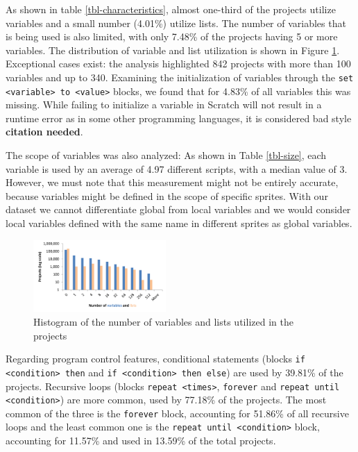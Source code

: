 \documentclass{sig-alternate}
\newcommand{\todo}[1]{\textbf{#1}}
\begin{document}
As shown in table \ref{tbl-characteristics}, almost one-third of the projects utilize variables and a small number (4.01\%) utilize lists. The number of variables that is being used is also limited, with only 7.48\% of the projects having 5 or more variables. The distribution of variable and list utilization is shown in Figure \ref{fig:variables}. Exceptional cases exist: the analysis highlighted 842 projects with more than 100 variables and up to 340. Examining the initialization of variables through the \texttt{set <variable> to <value>} blocks, we found that for 4.83\% of all variables this was missing. While failing to initialize a variable in Scratch will not result in a runtime error as in some other programming languages, it is considered bad style \todo{citation needed}.

The scope of variables was also analyzed: As shown in Table \ref{tbl-size}, each variable is used by an average of 4.97 different scripts, with a median value of 3. However, we must note that this measurement might not be entirely accurate, because variables might be defined in the scope of specific sprites. With our dataset we cannot differentiate global from local variables and we would consider local variables defined with the same name in different sprites as global variables.

\begin{figure}
	\centering
	\includegraphics[width=0.45\textwidth]{fig/charts/8variableslists}
	\caption{Histogram of the number of variables and lists utilized in the projects}
	\label{fig:variables}
\end{figure}

Regarding program control features, conditional statements (blocks \texttt{if <condition> then} and \texttt{if <condition> then else}) are used by 39.81\% of the projects. Recursive loops (blocks \texttt{repeat <times>}, \texttt{forever} and \texttt{repeat until <condition>}) are more common, used by 77.18\% of the projects. The most common of the three is the \texttt{forever} block, accounting for 51.86\% of all recursive loops and the least common one is the \texttt{repeat until <condition>} block, accounting for 11.57\% and used in 13.59\% of the total projects.
	
\end{document}

